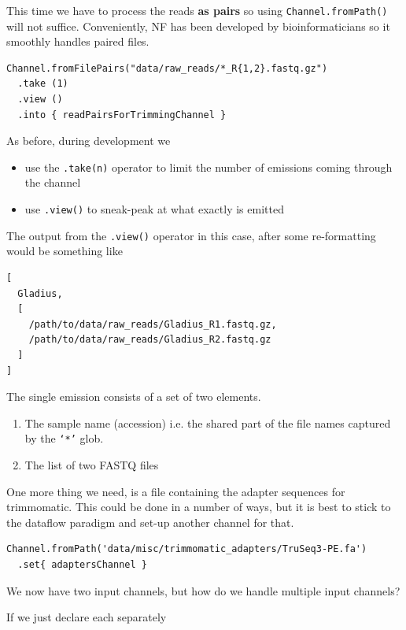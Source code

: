 This time we have to process the reads \textbf{as pairs} so using \texttt{Channel.fromPath()} 
will not suffice. Conveniently, NF has been developed by bioinformaticians so 
it smoothly handles paired files. 

\begin{lstlisting}
Channel.fromFilePairs("data/raw_reads/*_R{1,2}.fastq.gz")
  .take (1)
  .view ()
  .into { readPairsForTrimmingChannel }
\end{lstlisting}


\begin{note}
As before, during development we
\begin{itemize}
 \item use the \texttt{.take(n)} operator to limit the number of emissions coming through the channel
 \item use \texttt{.view()} to sneak-peak at what exactly is emitted
\end{itemize}
\end{note}

The output from the \texttt{.view()} operator in this case,
after some re-formatting would be something like

\begin{lstlisting}
[
  Gladius, 
  [
    /path/to/data/raw_reads/Gladius_R1.fastq.gz, 
    /path/to/data/raw_reads/Gladius_R2.fastq.gz
  ]
]
\end{lstlisting}

The single emission consists of a set of two elements. 
\begin{enumerate}
\item The sample name (accession) i.e. the shared part of the file names captured by the \texttt{`*'} glob. 
\item The list of two FASTQ files 
\end{enumerate}

One more thing we need, is a file containing the adapter sequences for trimmomatic.
This could be done in a number of ways, but it is best to stick to the dataflow paradigm 
and set-up another channel for that.

\begin{lstlisting}
Channel.fromPath('data/misc/trimmomatic_adapters/TruSeq3-PE.fa')
  .set{ adaptersChannel }
\end{lstlisting}

We now have two input channels, but how do we handle multiple input channels? 

If we just declare each separately 

